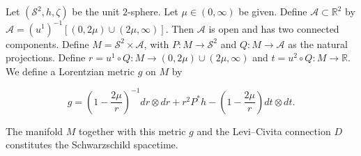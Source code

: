 Let $(\mathcal{S}^2, h, \zeta)$ be the unit $2$-sphere. Let $\mu \in (0, \infty)$ be given. Define $\mathcal{A} \subset \mathbb{R}^2$ by $\mathcal{A} = (u^1)^{-1}[(0, 2\mu) \cup (2\mu, \infty)]$. Then $\mathcal{A}$ is open and has two connected components. Define $M = \mathcal{S}^2 \times \mathcal{A}$, with $P: M \rightarrow \mathcal{S}^2$ and $Q: M \rightarrow \mathcal{A}$ as the natural projections. Define $r = u^1 \circ Q: M \rightarrow (0, 2\mu) \cup (2\mu, \infty)$ and $t = u^2 \circ Q: M \rightarrow \mathbb{R}$. We define a Lorentzian metric $g$ on $M$ by

$$g = \left(1 - \frac{2\mu}{r}\right)^{-1} dr \otimes dr + r^2 P^* h - \left(1 - \frac{2\mu}{r}\right) dt \otimes dt.$$

The manifold $M$ together with this metric $g$ and the Levi–Civita connection $D$ constitutes the Schwarzschild spacetime.
